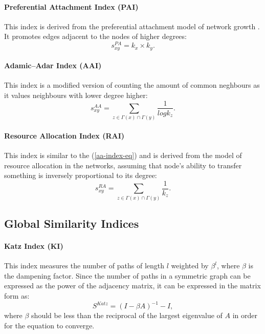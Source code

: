 \documentclass{llncs}
\begin{document}
\paragraph{Preferential Attachment Index (PAI)}
%
This index is derived from the preferential attachment model of network growth \cite{netw-growth}. It promotes edges adjacent to the nodes of higher degrees:
\begin{equation}
s_{xy}^{PA} = k_x \times k_y.
\end{equation}
%
\paragraph{Adamic–Adar Index (AAI) \cite{aa-index}}
%
This index is a modified version of counting the amount of common neghbours as it values neighbours with lower degree higher:
\begin{equation}
s_{xy}^{AA} = \sum_{z \in \Gamma(x) \cap \Gamma(y)} \frac{1}{log k_z}.
\label{aa-index-eq}
\end{equation}
%
\paragraph{Resource Allocation Index (RAI) \cite{rai-index}}
%
This index is similar to the (\ref{aa-index-eq}) and is derived from the model of resource allocation in the networks, assuming that node's ability to transfer something is inversely proportional to its degree:
\begin{equation}
s_{xy}^{RA} = \sum_{z \in \Gamma(x) \cap \Gamma(y)} \frac{1}{k_z}.
\end{equation}
%
\subsection{Global Similarity Indices}
%
\paragraph{Katz Index (KI) \cite{katz-index}}
%
This index measures the number of paths of length $l$ weighted by $\beta^l$, where $\beta$ is the dampening factor. Since the number of paths in a symmetric graph can be expressed as the power of the adjacency matrix, it can be expressed in the matrix form as:
\begin{equation}
S^{Katz} = (I - \beta A)^{-1} - I,
\end{equation}
where $\beta$ should be less than the reciprocal of the largest eigenvalue of $A$ in order for the equation to converge.
%
\end{document}
